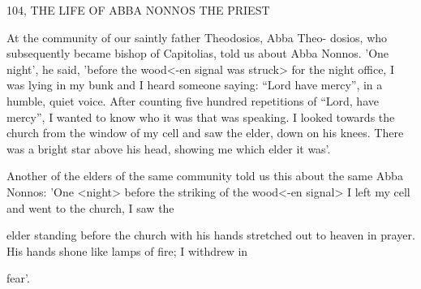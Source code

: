 104, THE LIFE OF ABBA NONNOS THE PRIEST

At the community of our saintly father Theodosios, Abba Theo-
dosios, who subsequently became bishop of Capitolias, told us
about Abba Nonnos.
'One night', he said, 'before the wood<-en
signal was struck> for the night office, I was lying in my bunk and
I heard someone saying: “Lord have mercy”, in a humble, quiet
voice.
After counting five hundred repetitions of “Lord, have
mercy”, I wanted to know who it was that was speaking.
I looked
towards the church from the window of my cell and saw the elder,
down on his knees.
There was a bright star above his head, showing
me which elder it was'.

Another of the elders of the same community told us this about
the same Abba Nonnos: 'One <night> before the striking of the
wood<-en signal> I left my cell and went to the church, I saw the

elder standing before the church with his hands stretched out to
heaven in prayer.
His hands shone like lamps of fire; I withdrew in

fear'.

